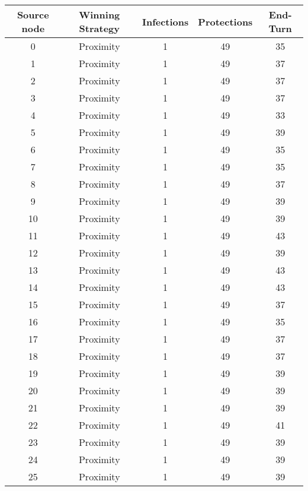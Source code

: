 \documentclass[results.tex]{subfiles}
\begin{document}
\begin{center}
  \begin{tabular}{| c || c | c | c | c |}
    \hline
    {\bfseries Source node} & {\bfseries Winning Strategy} & {\bfseries Infections} & {\bfseries Protections} & {\bfseries End-Turn} \\  %
    \hline\hline
    0 & Proximity & 1 & 49 & 35 \\ 
    \hline
    1 & Proximity & 1 & 49 & 37 \\ 
    \hline
    2 & Proximity & 1 & 49 & 37 \\ 
    \hline
    3 & Proximity & 1 & 49 & 37 \\ 
    \hline
    4 & Proximity & 1 & 49 & 33 \\ 
    \hline
    5 & Proximity & 1 & 49 & 39 \\ 
    \hline
    6 & Proximity & 1 & 49 & 35 \\ 
    \hline
    7 & Proximity & 1 & 49 & 35 \\ 
    \hline
    8 & Proximity & 1 & 49 & 37 \\ 
    \hline
    9 & Proximity & 1 & 49 & 39 \\ 
    \hline
    10 & Proximity & 1 & 49 & 39 \\ 
    \hline
    11 & Proximity & 1 & 49 & 43 \\ 
    \hline
    12 & Proximity & 1 & 49 & 39 \\ 
    \hline
    13 & Proximity & 1 & 49 & 43 \\ 
    \hline
    14 & Proximity & 1 & 49 & 43 \\ 
    \hline
    15 & Proximity & 1 & 49 & 37 \\ 
    \hline
    16 & Proximity & 1 & 49 & 35 \\ 
    \hline
    17 & Proximity & 1 & 49 & 37 \\ 
    \hline
    18 & Proximity & 1 & 49 & 37 \\ 
    \hline
    19 & Proximity & 1 & 49 & 39 \\ 
    \hline
    20 & Proximity & 1 & 49 & 39 \\ 
    \hline
    21 & Proximity & 1 & 49 & 39 \\ 
    \hline
    22 & Proximity & 1 & 49 & 41 \\ 
    \hline
    23 & Proximity & 1 & 49 & 39 \\ 
    \hline
    24 & Proximity & 1 & 49 & 39 \\ 
    \hline
    25 & Proximity & 1 & 49 & 39 \\ 

\end{tabular}
\end{center}
\end{document}
